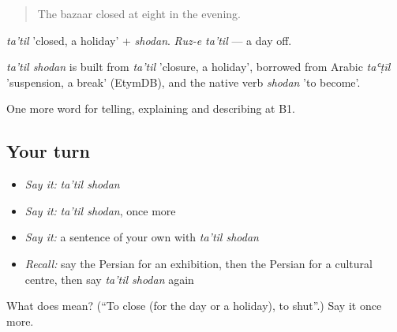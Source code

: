 \begin{quote}
The bazaar closed at eight in the evening.
\end{quote}

\emph{ta'til} 'closed, a holiday' + \emph{shodan}. \emph{Ruz-e ta'til} — a day off.

\begin{cousinweb}
\emph{ta'til shodan} is built from \emph{ta'til} 'closure, a holiday', borrowed from Arabic \emph{taʿṭīl} 'suspension, a break' (EtymDB), and the native verb \emph{shodan} 'to become'.
\end{cousinweb}

\begin{grammarlens}[title={What you've built}]
One more word for telling, explaining and describing at B1.
\end{grammarlens}

\subsection*{Your turn}
\begin{itemize}
\raggedright
  \item \emph{Say it:} \emph{ta'til shodan}
  \item \emph{Say it:} \emph{ta'til shodan}, once more
  \item \emph{Say it:} a sentence of your own with \emph{ta'til shodan}
  \item \emph{Recall:} say the Persian for an exhibition, then the Persian for a cultural centre, then say \emph{ta'til shodan} again
\end{itemize}

\begin{tcolorbox}[breakable,colback=teal!4,colframe=teal!35!black,title={Before you move on}]
What does   mean? (\textquotedblleft{}To close (for the day or a holiday), to shut\textquotedblright{}.) Say it once more.
\end{tcolorbox}
